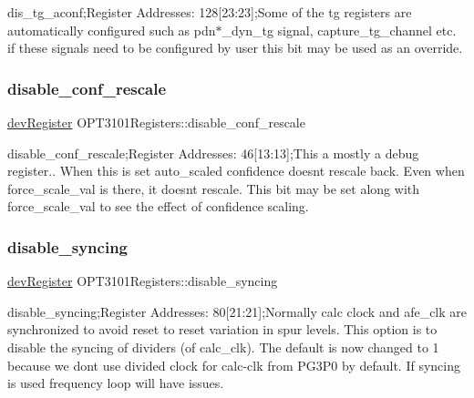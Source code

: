 dis\+\_\+tg\+\_\+aconf;Register Addresses\+: 128\mbox{[}23\+:23\mbox{]};Some of the tg registers are automatically configured such as pdn$\ast$\+\_\+dyn\+\_\+tg signal, capture\+\_\+tg\+\_\+channel etc. if these signals need to be configured by user this bit may be used as an override. 

\mbox{\label{class_o_p_t3101_registers_a73a7ffc9accc55fceffd43472580d9d2}} 
\subsubsection{\texorpdfstring{disable\+\_\+conf\+\_\+rescale}{disable\_conf\_rescale}}
{\footnotesize\ttfamily \mbox{\hyperlink{classdev_register}{dev\+Register}} O\+P\+T3101\+Registers\+::disable\+\_\+conf\+\_\+rescale}



disable\+\_\+conf\+\_\+rescale;Register Addresses\+: 46\mbox{[}13\+:13\mbox{]};This a mostly a debug register.. When this is set auto\+\_\+scaled confidence doesn\textquotesingle{}t rescale back. Even when force\+\_\+scale\+\_\+val is there, it doesn\textquotesingle{}t rescale. This bit may be set along with force\+\_\+scale\+\_\+val to see the effect of confidence scaling. 

\mbox{\label{class_o_p_t3101_registers_a0204cc868b4e5930fb53478f73f83773}} 
\subsubsection{\texorpdfstring{disable\+\_\+syncing}{disable\_syncing}}
{\footnotesize\ttfamily \mbox{\hyperlink{classdev_register}{dev\+Register}} O\+P\+T3101\+Registers\+::disable\+\_\+syncing}



disable\+\_\+syncing;Register Addresses\+: 80\mbox{[}21\+:21\mbox{]};Normally calc clock and afe\+\_\+clk are synchronized to avoid reset to reset variation in spur levels. This option is to disable the syncing of dividers (of calc\+\_\+clk). The default is now changed to \textquotesingle{}1\textquotesingle{} because we don\textquotesingle{}t use divided clock for calc-\/clk from P\+G3\+P0 by default. If syncing is used frequency loop will have issues. 


